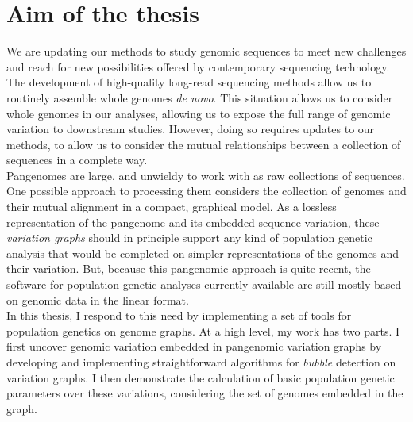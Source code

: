 
\chapter{Aim of the thesis} %

\label{Chapter4} %



We are updating our methods to study genomic sequences to meet new challenges and reach for new possibilities offered by contemporary sequencing technology. The development of high-quality long-read sequencing methods allow us to routinely assemble whole genomes \emph{de novo}. This situation allows us to consider whole genomes in our analyses, allowing us to expose the full range of genomic variation to downstream studies. However, doing so requires updates to our methods, to allow us to consider the mutual relationships between a collection of sequences in a complete way.\\

Pangenomes are large, and unwieldy to work with as raw collections of sequences. One possible approach to processing them considers the collection of genomes and their mutual alignment in a compact, graphical model. As a lossless representation of the pangenome and its embedded sequence variation, these \emph{variation graphs} should in principle support any kind of population genetic analysis that would be completed on simpler representations of the genomes and their variation. But, because this pangenomic approach is quite recent, the software for population genetic analyses currently available are still mostly based on genomic data in the linear format.\\

In this thesis, I respond to this need by implementing a set of tools for population genetics on genome graphs. At a high level, my work has two parts. I first uncover genomic variation embedded in pangenomic variation graphs by developing and implementing straightforward algorithms for \emph{bubble} detection on variation graphs. I then demonstrate the calculation of basic population genetic parameters over these variations, considering the set of genomes embedded in the graph.\\

